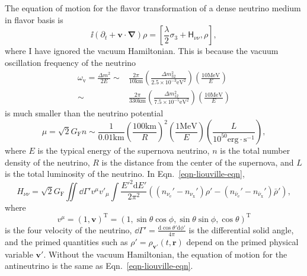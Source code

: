 The equation of motion for the flavor transformation of a dense neutrino medium in flavor basis is
\begin{equation}
\ii (\partial_t + \mathbf v\cdot \mathbf{\nabla}) \rho = \left[ \frac{\lambda}{2} \sigma_3 + \mathsf H_{\nu\nu}, \rho \right],
\label{eqn-liouville-eqn}
\end{equation}
where I have ignored the vacuum Hamiltonian. This is because the vacuum oscillation frequency of the neutrino
\begin{align*}
 \omega_{\mathrm v} = \frac{\Delta m^2}{2E}  \sim& \frac{2\pi}{ 10  \mathrm{km} }  \left(\frac{\Delta m^2_{32}}{2.5\times 10^{-3} \mathrm{eV}^2 } \right) \left( \frac{10 \mathrm{MeV}}{E} \right) \\
\sim & \frac{2\pi}{ 330  \mathrm{km} } \left( \frac{\Delta m_{12}^2}{7.5\times 10^{-5}\mathrm{eV}^2} \right) \left( \frac{10 \mathrm{MeV}}{E} \right)
\end{align*}
is much smaller than the neutrino potential
\begin{equation*}
\mu = \sqrt{2}G_{\mathrm F} n \sim  \frac{1}{0.01 \mathrm{km}} \left(\frac{100\mathrm{km}}{R}\right)^2 \left(\frac{1\mathrm{MeV}}{E}\right) \left( \frac{ L }{ 10^{50}\mathrm{erg\cdot s^{-1}} } \right),
\end{equation*}
where $E$ is the typical energy of the supernova neutrino, $n$ is the total number density of the neutrino, $R$ is the distance from the center of the supernova, and $L$ is the total luminosity of the neutrino.
In Eqn.~\eqref{eqn-liouville-eqn},
\begin{equation}
H_{\nu\nu} = \sqrt{2} G_{\mathrm F} \iint \dd \Gamma' v^\mu v'_\mu \int \frac{E'^2 \mathrm d E'}{2\pi^2} \left( (n_{\nu_{\mathrm e}}' - n_{\nu_{\mathrm x}}' )\rho' -  (n_{\bar\nu_{\mathrm e}}' - n_{\bar\nu_{\mathrm x}}' ) \bar\rho' \right),
\end{equation}
where
\begin{equation}
    v^\mu = (1, \mathbf v)^{\mathrm T} = ( 1, \sin\theta\cos\phi, \sin\theta\sin\phi, \cos\theta )^{\mathrm T}
\end{equation}
is the four velocity of the neutrino, $\dd \Gamma' = \frac{\mathrm d \cos\theta' \mathrm d\phi'}{4\pi}$ is the differential solid angle, and the primed quantities such as $\rho'=\rho_{\mathbf v'} (t, \mathbf r)$ depend on the primed physical variable $\mathbf v'$. Without the vacuum Hamiltonian, the equation of motion for the antineutrino is the same as Eqn.~\eqref{eqn-liouville-eqn}.

